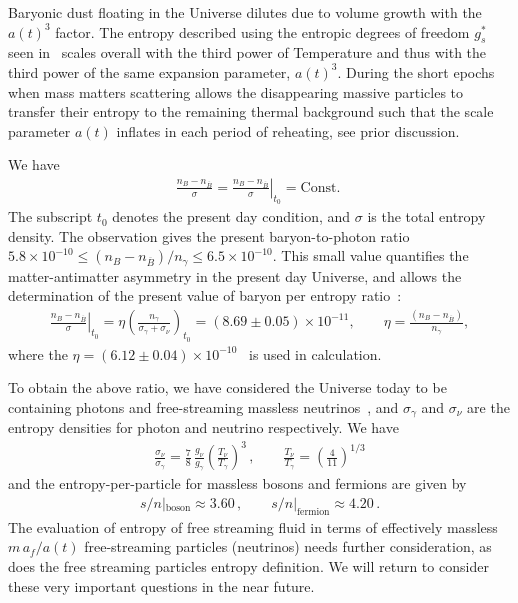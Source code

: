 Baryonic dust floating in the Universe dilutes due to volume growth with the $a(t)^3$ factor. The entropy described using the entropic degrees of freedom $g^\ast_s$ seen in~ scales overall with the third power of Temperature and thus with the third power of the same expansion parameter, $a(t)^3$. During the short epochs when mass matters scattering allows the disappearing massive particles to transfer their entropy to the remaining thermal background such that the scale parameter $a(t)$ inflates in each period of reheating, see prior discussion. 

We have
\begin{align}
\frac{n_B-n_{\overline{B}}}{\sigma}= \left.\frac{n_B-n_{\overline{B}}}{ \sigma}\right|_{t_0}=\mathrm{Const.}\;
\end{align}
The subscript $t_0$ denotes the present day condition, and $\sigma$ is the total entropy density.
The observation gives the present baryon-to-photon ratio~\cite{ParticleDataGroup:2022pth} $5.8 \times 10^{-10} \leqslant(n_B-n_{\overline{B}})/n_\gamma\leqslant6.5\times10^{-10}$. This small value quantifies the matter-antimatter asymmetry in the present day Universe, and allows the determination of the present value of baryon per entropy ratio~\cite{Rafelski:2019twp,Fromerth:2002wb,Fromerth:2012fe}:
\begin{align}\label{BaryonEntropyRatio}
\left.\frac{n_B-n_{\overline{B}}}{ \sigma}\right|_{t_0}=\eta\left(\frac{n_\gamma}{\sigma_\gamma+\sigma_\nu}\right)_{\!t_0}\!\!\!\!=(8.69\pm0.05)\!\!\times\!\!10^{-11},\qquad \eta=\frac{(n_B-n_{\overline{B}})}{n_\gamma},
\end{align}
where the $\eta=(6.12\pm0.04)\times10^{-10}$~\cite{ParticleDataGroup:2022pth} is used in calculation. 

To obtain the above ratio, we have considered the Universe today to be containing photons and free-streaming massless neutrinos~\cite{Birrell:2012gg}, and $\sigma_\gamma$ and $\sigma_\nu$ are the entropy densities for photon and neutrino respectively. We have
\begin{align}
 \frac{\sigma_\nu}{\sigma_\gamma}=\frac{7}{8}\,\frac{g_\nu}{g_\gamma}\left(\frac{T_\nu}{T_\gamma}\right)^3\,,\qquad\frac{T_\nu}{T_\gamma}=\left(\frac{4}{11}\right)^{1/3}
\end{align}
and the entropy-per-particle for massless bosons and fermions are given by~\cite{Fromerth:2012fe}
\begin{align}
s/n|_\mathrm{boson}\approx 3.60\,,\qquad
s/n|_\mathrm{fermion}\approx 4.20\,.
\end{align}
The evaluation of entropy of free streaming fluid in terms of effectively massless $m\,a_f/a(t)$ free-streaming particles (neutrinos) needs further consideration, as does the free streaming particles entropy definition. We will return to consider these very important questions in the near future.
